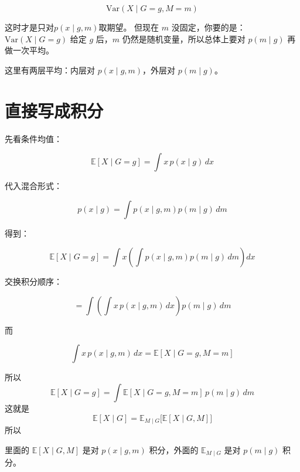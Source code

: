 \[
\mathrm{Var}(X\mid G=g,M=m)
\]

这时才是只对\(p(x\mid g,m)\)取期望。
但现在 \(m\) 没固定，你要的是：\(\mathrm{Var}(X\mid G=g)\)
给定 \(g\) 后，\(m\) 仍然是随机变量，所以总体上要对 \(p(m\mid g)\) 再做一次平均。

这里有两层平均：内层对 \(p(x\mid g,m)\)，外层对 \(p(m\mid g)\)。

\section{直接写成积分}

先看条件均值：

\[
\mathbb{E}[X\mid G=g]
=
\int x\,p(x\mid g)\,dx
\]

代入混合形式：

\[
p(x\mid g)=\int p(x\mid g,m)p(m\mid g)\,dm
\]

得到：

\[
\mathbb{E}[X\mid G=g]
=
\int x\left(\int p(x\mid g,m)p(m\mid g)\,dm\right)dx
\]

交换积分顺序：

\[
=
\int \left(\int x\,p(x\mid g,m)\,dx\right)p(m\mid g)\,dm
\]

而

\[
\int x\,p(x\mid g,m)\,dx = \mathbb{E}[X\mid G=g,M=m]
\]

所以
\[
\mathbb{E}[X\mid G=g]
=
\int \mathbb{E}[X\mid G=g,M=m]\,p(m\mid g)\,dm
\]
这就是
\[
\mathbb{E}[X\mid G]
=
\mathbb{E}_{M\mid G}\big[\mathbb{E}[X\mid G,M]\big]
\]
所以

里面的 \(\mathbb{E}[X\mid G,M]\) 是对 \(p(x\mid g,m)\) 积分，外面的 \(\mathbb{E}_{M\mid G}\) 是对 \(p(m\mid g)\) 积分。
